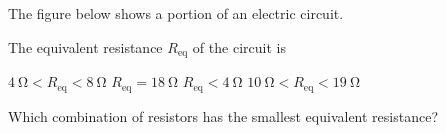 \documentclass[]{exam}
\begin{document}
\begin{questions}
\question
The figure below shows a portion of an electric circuit.

\begin{center}
\end{center}


The equivalent resistance $R_\mathrm{eq}$ of the circuit is
\bigskip

\begin{randomizechoices}
    \choice $\SI{4}{\ohm} < R_\mathrm{eq} < \SI{8}{\ohm}$
    \choice $R_\mathrm{eq} = \SI{18}{\ohm}$
    \correctchoice $R_\mathrm{eq} < \SI{4}{\ohm}$
    \choice $\SI{10}{\ohm} < R_\mathrm{eq} < \SI{19}{\ohm}$
\end{randomizechoices}


\question
Which combination of resistors has the smallest equivalent resistance?


\end{questions}
\end{document}
